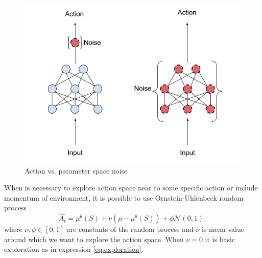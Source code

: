 \begin{figure}[!h]
\centering
\includegraphics[scale=0.5]{fig/perturbations.png}
\caption{Action vs. parameter space noise}
\label{fig:exploration}
\end{figure}

When is necessary to explore action space near to some specific action or include momentum of environment, it is possible to use Ornstein-Uhlenbeck random process \citep{lilicrap2015}. 
\begin{equation}
\hat{A_t} = \mu^\theta(S)  + \nu (\rho - \mu^\theta(S)) + \phi \mathcal{N}(0, 1),
\end{equation}
where $\nu, \phi \in [0, 1]$ are constants of the random process and $\nu$ is mean value around which we want to explore the action space. When $\nu = 0$ it is basic exploration as in expression \eqref{eq:exploration}.